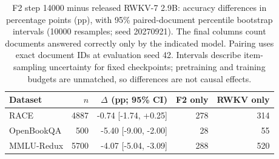 \begin{table}[t]
\centering
\small
\begin{tabular}{lrrrr}
\toprule
Dataset & $n$ & $\Delta$ (pp; 95\% CI) & F2 only & RWKV only \\
\midrule
RACE & 4887 & -0.74 [-1.74, +0.25] & 278 & 314 \\
OpenBookQA & 500 & -5.40 [-9.00, -2.00] & 28 & 55 \\
MMLU-Redux & 5700 & -4.07 [-5.04, -3.09] & 288 & 520 \\
\bottomrule
\end{tabular}
\caption{F2 step 14000 minus released RWKV-7 2.9B: accuracy differences in percentage points (pp), with 95\% paired-document percentile bootstrap intervals (10000 resamples; seed 20270921). The final columns count documents answered correctly only by the indicated model. Pairing uses exact document IDs at evaluation seed 42. Intervals describe item-sampling uncertainty for fixed checkpoints; pretraining and training budgets are unmatched, so differences are not causal effects.}
\label{tab:basic-ability-contrasts}
\end{table}
